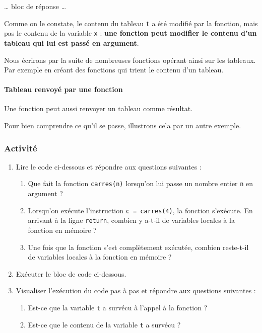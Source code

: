 \documentclass[a4paper,17pt]{extarticle}
\providecommand{\tightlist}{%
      \setlength{\itemsep}{0pt}\setlength{\parskip}{0pt}}
\begin{document}
    \ldots{} bloc de réponse \ldots{}

    Comme on le constate, le contenu du tableau \texttt{t} a été modifié par
la fonction, mais pas le contenu de la variable \texttt{x} : \textbf{une
fonction peut modifier le contenu d'un tableau qui lui est passé en
argument}.

Nous écrirons par la suite de nombreuses fonctions opérant ainsi sur les
tableaux. Par exemple en créant des fonctions qui trient le contenu d'un
tableau.

    \hypertarget{tableau-renvoyuxe9-par-une-fonction}{%
\paragraph{Tableau renvoyé par une
fonction}\label{tableau-renvoyuxe9-par-une-fonction}}

    Une fonction peut aussi renvoyer un tableau comme résultat.

Pour bien comprendre ce qu'il se passe, illustrons cela par un autre
exemple.

    \hypertarget{activituxe9}{%
\subsubsection{Activité}\label{activituxe9}}

\begin{enumerate}
\def\labelenumi{\arabic{enumi}.}
\tightlist
\item
  Lire le code ci-dessous et répondre aux questions suivantes :

  \begin{enumerate}
  \def\labelenumii{\arabic{enumii}.}
  \tightlist
  \item
    Que fait la fonction \texttt{carres(n)} lorsqu'on lui passe un
    nombre entier \texttt{n} en argument ?
  \item
    Lorsqu'on exécute l'instruction \texttt{c\ =\ carres(4)}, la
    fonction s'exécute. En arrivant à la ligne \texttt{return}, combien
    y a-t-il de variables locales à la fonction en mémoire ?
  \item
    Une fois que la fonction s'est complètement exécutée, combien
    reste-t-il de variables locales à la fonction en mémoire ?
  \end{enumerate}
\item
  Exécuter le bloc de code ci-dessous.
\item
  Visualiser l'exécution du code pas à pas et répondre aux questions
  suivantes :

  \begin{enumerate}
  \def\labelenumii{\arabic{enumii}.}
  \tightlist
  \item
    Est-ce que la variable \texttt{t} a survécu à l'appel à la fonction
    ?
  \item
    Est-ce que le contenu de la variable \texttt{t} a survécu ?
  \end{enumerate}
\end{enumerate}
\end{document}
